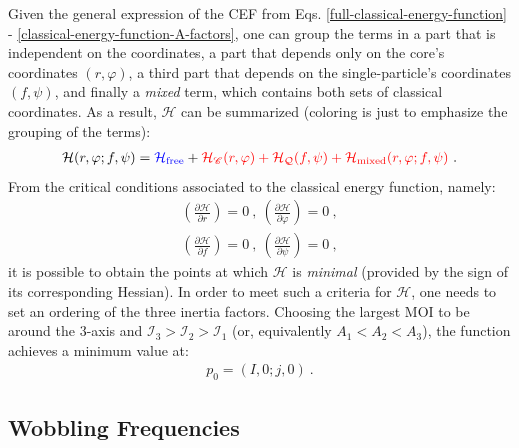Given the general expression of the CEF from Eqs. \ref{full-classical-energy-function} - \ref{classical-energy-function-A-factors}, one can group the terms in a part that is independent on the coordinates, a part that depends only on the core's coordinates $(r,\varphi)$, a third part that depends on the single-particle's coordinates $(f,\psi)$, and finally a \emph{mixed} term, which contains both sets of classical coordinates. As a result, $\mathcal{H}$ can be summarized (coloring is just to emphasize the grouping of the terms):
\begin{align}
    \mathcal{H}(r,\varphi;f,\psi)={\color{blue}\mathcal{H}_\text{free}}+{\color{red}\mathcal{H}_\mathscr{C}(r,\varphi)+\mathcal{H}_\mathcal{Q}(f,\psi)+\mathcal{H}_\text{mixed}(r,\varphi;f,\psi)}\ .
    \label{classical-energy-function-terms}
\end{align}
From the critical conditions associated to the classical energy function, namely:
\begin{gather*}
    \left(\frac{\partial \mathcal{H}}{\partial r}\right)=0\ ,\ \left(\frac{\partial \mathcal{H}}{\partial \varphi}\right)=0\ ,\\
    \left(\frac{\partial \mathcal{H}}{\partial f}\right)=0\ ,\ \left(\frac{\partial \mathcal{H}}{\partial \psi}\right)=0\ ,
\end{gather*}
it is possible to obtain the points at which $\mathcal{H}$ is \emph{minimal} (provided by the sign of its corresponding Hessian). In order to meet such a criteria for $\mathcal{H}$, one needs to set an ordering of the three inertia factors. Choosing the largest MOI to be around the $3$-axis and $\mathcal{I}_3>\mathcal{I}_2>\mathcal{I}_1$ (or, equivalently $A_1<A_2<A_3$), the function achieves a minimum value at:
\begin{align}
    p_0=(I,0;j,0)\ .
    \label{cef-minimum-point-p0}
\end{align}

\subsection{Wobbling Frequencies}

